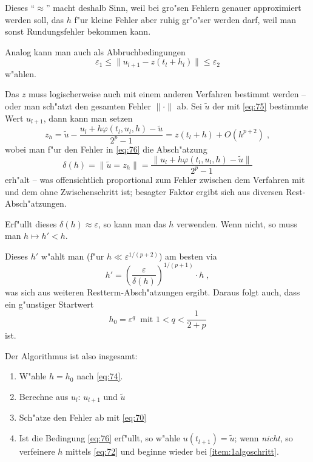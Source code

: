 \documentclass[a4paper]{book}
\newcommand{\abs}{\bigskip \noindent}
\begin{document}
Dieses "`$\approx$"' macht deshalb Sinn, weil bei gro"sen Fehlern
genauer approximiert werden soll, das $h$ f"ur kleine Fehler aber
ruhig gr"o"ser werden darf, weil man sonst Rundungsfehler bekommen
kann. 

Analog kann man auch als Abbruchbedingungen
\begin{equation*}
   \varepsilon_1 \leq \| u_{l+1} - z(t_l + h_l) \| \leq \varepsilon_2
\end{equation*}
w"ahlen.

Das $z$ muss logischerweise auch mit einem anderen Verfahren bestimmt
werden -- oder man sch"atzt den gesamten Fehler $\| \cdot \|$ ab.
Sei $\tilde
u$ der mit  \eqref{eq:75} bestimmte Wert $u_{l+1}$, dann kann man setzen
\begin{equation}
  \label{eq:77}
  z_h = \tilde u - \frac{u_l + h\varphi(t_l, u_l, h) - \tilde
    u}{2^p-1} = z(t_l+h) + O(h^{p+2}) \;,
\end{equation}
wobei man f"ur den Fehler in \eqref{eq:76} die Absch"atzung
\begin{equation}
  \label{eq:70}
  \delta(h) = \| \tilde u = z_h \| = \frac{\| u_l + h \varphi(t_l,
    u_l, h) - \tilde u \|}{2^{p}-1}
\end{equation}
erh"alt -- was offensichtlich proportional zum Fehler zwischen dem
Verfahren mit und dem ohne Zwischenschritt ist; besagter Faktor ergibt
sich aus diversen Rest-Absch"atzungen.

Erf"ullt dieses $\delta(h) \approx \varepsilon$, so kann man das $h$
verwenden. Wenn nicht, so muss man $h \mapsto h' < h$.

Dieses $h'$ w"ahlt man (f"ur $h \ll \varepsilon^{1/(p+2)}$) am besten
via
\begin{equation}
  \label{eq:72}
  h' = \left ( \frac{\varepsilon}{\delta(h)} \right )^{1/(p+1)} \cdot
  h \;,
\end{equation}
was sich aus weiteren Restterm-Absch"atzungen ergibt. Daraus folgt
auch, dass ein g"unstiger Startwert
\begin{equation}
  \label{eq:74}
  h_0 = \varepsilon^q ~ \text{ mit } 1 < q < \frac{1}{2+p}
\end{equation}
ist.

\abs
Der Algorithmus ist also insgesamt:
\begin{enumerate}
\item W"ahle $h = h_0$ nach \eqref{eq:74}. \label{item:1algoschritt}
\item Berechne aus $u_l$: $u_{l+1}$ und $\tilde u$
\item Sch"atze den Fehler ab mit \eqref{eq:70}
\item Ist die Bedingung \eqref{eq:76} erf"ullt, so w"ahle $u(t_{l+1})
  = \tilde u$; wenn \emph{nicht}, so verfeinere $h$ mittels
  \eqref{eq:72} und beginne wieder bei \ref{item:1algoschritt}.
\end{enumerate}
\end{document}
